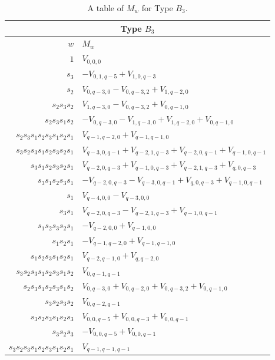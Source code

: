 \documentclass{amsart}
\theoremstyle{definition}
\begin{document}
\begin{table}
\renewcommand{\arraystretch}{1.5}
\caption{A table of $M_w$ for Type $B_3$.\label{tab:b3}}
\begin{tabular}{|r|l|}
\hline
\multicolumn{2}{||c||}{Type $B_3$}\\
\hline $w$ & $M_w$\\
\hline
    $1$ & $V_{0,0,0}$ \\
$s_3$ & $-V_{0,1,q-5} + V_{1,0,q-3}$ \\
$s_2$ & $V_{0,q-3,0} - V_{0,q-3,2} + V_{1,q-2,0}$ \\
$s_2s_3s_2$ & $V_{1,q-3,0} - V_{0,q-3,2} + V_{0,q-1,0}$ \\
$s_2s_3s_1s_2$ & $-V_{0,q-3,0} - V_{1,q-3,0} + V_{1,q-2,0} + V_{0,q-1,0}$ \\
$s_2s_3s_1s_2s_3s_1s_2s_1$ & $V_{q-1,q-2,0} + V_{q-1,q-1,0}$ \\
$s_3s_2s_3s_1s_2s_3s_2s_1$ & $V_{q-3,0,q-1} + V_{q-2,1,q-3} + V_{q-2,0,q-1} + V_{q-1,0,q-1}$ \\
$s_3s_1s_2s_3s_2s_1$ & $V_{q-2,0,q-3} + V_{q-1,0,q-3} + V_{q-2,1,q-3} + V_{q,0,q-3}$ \\
$s_3s_1s_2s_3s_1$ & $-V_{q-2,0,q-3} - V_{q-3,0,q-1} + V_{q,0,q-3} + V_{q-1,0,q-1}$ \\
$s_1$ & $V_{q-4,0,0} - V_{q-3,0,0}$ \\
$s_3s_1$ & $V_{q-2,0,q-3} - V_{q-2,1,q-3} + V_{q-1,0,q-1}$ \\
$s_1s_2s_3s_2s_1$ & $-V_{q-2,0,0} + V_{q-1,0,0}$ \\
$s_1s_2s_1$ & $-V_{q-1,q-2,0} + V_{q-1,q-1,0}$ \\
$s_1s_2s_3s_1s_2s_1$ & $V_{q-2,q-1,0} + V_{q,q-2,0}$ \\
$s_3s_2s_3s_1s_2s_3s_1s_2$ & $V_{0,q-1,q-1}$ \\
$s_2s_3s_1s_2s_3s_1s_2$ & $V_{0,q-3,0} + V_{0,q-2,0} + V_{0,q-3,2} + V_{0,q-1,0}$ \\
$s_3s_2s_3s_2$ & $V_{0,q-2,q-1}$ \\
$s_3s_2s_3s_1s_2s_3$ & $V_{0,0,q-5} + V_{0,0,q-3} + V_{0,0,q-1}$ \\
$s_3s_2s_3$ & $-V_{0,0,q-5} + V_{0,0,q-1}$ \\
$s_3s_2s_3s_1s_2s_3s_1s_2s_1$ & $V_{q-1,q-1,q-1}$ \\
    \hline
\end{tabular}
\end{table}
\end{document}
